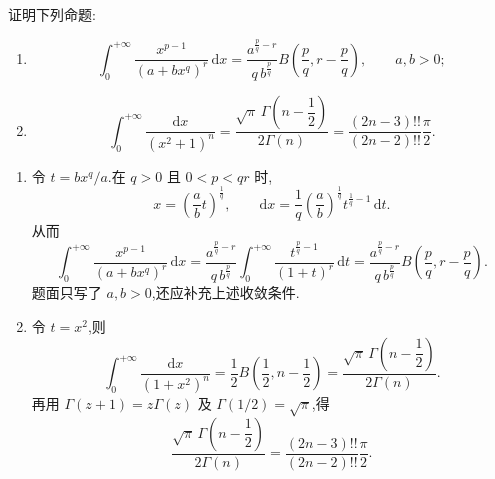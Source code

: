 \begin{example}
    证明下列命题:
    \begin{enumerate}
        \item
              \[
                  \displaystyle\int_0^{+\infty}\dfrac{x^{p-1}}{(a+bx^q)^r}\,\mathrm{d}x
                  =\dfrac{a^{\frac{p}{q}-r}}{q\,b^{\frac{p}{q}}}
                  B\left(\dfrac{p}{q},r-\dfrac{p}{q}\right),\qquad a,b>0;
              \]
        \item
              \[
                  \displaystyle\int_0^{+\infty}\dfrac{\mathrm{d}x}{(x^2+1)^n}
                  =\dfrac{\sqrt{\pi}\,\Gamma\left(n-\dfrac{1}{2}\right)}{2\Gamma(n)}
                  =\dfrac{(2n-3)!!}{(2n-2)!!}\dfrac{\pi}{2}.
              \]
    \end{enumerate}
\end{example}
\exampleblank

\begin{solution}
    \leavevmode
    \begin{enumerate}
        \item 令 $t=bx^q/a$.在 $q>0$ 且 $0<p<qr$ 时,
              \[
                  x=\left(\dfrac{a}{b}t\right)^{\frac{1}{q}},
                  \qquad
                  \mathrm{d}x=\dfrac{1}{q}\left(\dfrac{a}{b}\right)^{\frac{1}{q}}
                  t^{\frac{1}{q}-1}\,\mathrm{d}t.
              \]
              从而
              \[
                  \displaystyle\int_0^{+\infty}\dfrac{x^{p-1}}{(a+bx^q)^r}\,\mathrm{d}x
                  =\dfrac{a^{\frac{p}{q}-r}}{q\,b^{\frac{p}{q}}}
                  \int_0^{+\infty}\dfrac{t^{\frac{p}{q}-1}}{(1+t)^r}\,\mathrm{d}t
                  =\dfrac{a^{\frac{p}{q}-r}}{q\,b^{\frac{p}{q}}}
                  B\left(\dfrac{p}{q},r-\dfrac{p}{q}\right).
              \]
              题面只写了 $a,b>0$,还应补充上述收敛条件.
        \item 令 $t=x^2$,则
              \[
                  \displaystyle\int_0^{+\infty}\dfrac{\mathrm{d}x}{(1+x^2)^n}
                  =\dfrac{1}{2}B\left(\dfrac{1}{2},n-\dfrac{1}{2}\right)
                  =\dfrac{\sqrt\pi\,\Gamma\left(n-\dfrac{1}{2}\right)}{2\Gamma(n)}.
              \]
              再用 $\Gamma(z+1)=z\Gamma(z)$ 及 $\Gamma(1/2)=\sqrt\pi$,得
              \[
                  \dfrac{\sqrt\pi\,\Gamma\left(n-\dfrac{1}{2}\right)}{2\Gamma(n)}
                  =\dfrac{(2n-3)!!}{(2n-2)!!}\dfrac{\pi}{2}.
              \]
    \end{enumerate}
\end{solution}

